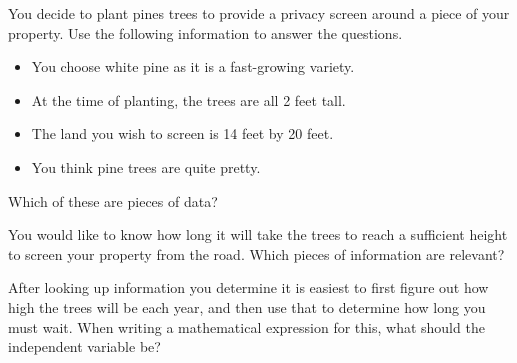 \documentclass{ximeraXloud}
\begin{document}
\begin{problem}
    You decide to plant pines trees to provide a privacy screen around a piece of your property. Use the following information to answer the questions.
    \begin{itemize}
        \item You choose white pine as it is a fast-growing variety.
        \item At the time of planting, the trees are all 2 feet tall.
        \item The land you wish to screen is 14 feet by 20 feet.
        \item You think pine trees are quite pretty.
    \end{itemize}
    Which of these are pieces of data?
    \begin{selectAll}
    \end{selectAll}

    \begin{problem}
        You would like to know how long it will take the trees to reach a sufficient height to screen your property from the road. Which pieces of information are relevant?
        \begin{selectAll}
        \end{selectAll}

        \begin{problem}
            After looking up information you determine it is easiest to first figure out how high the trees will be each year, and then use that to determine how long you must wait. When writing a mathematical expression for this, what should the independent variable be?
            \begin{multipleChoice}
            \end{multipleChoice}


\end{problem}
\end{problem}
\end{problem}
\end{document}
